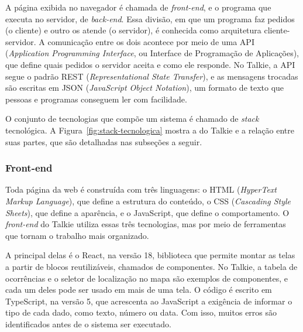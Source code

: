 \documentclass[12pt,a4paper]{article}
\begin{document}
A página exibida no navegador é chamada de \textit{front-end}, e o programa que executa no servidor, de \textit{back-end}. Essa divisão, em que um programa faz pedidos (o cliente) e outro os atende (o servidor), é conhecida como arquitetura cliente-servidor. A comunicação entre os dois acontece por meio de uma API (\textit{Application Programming Interface}, ou Interface de Programação de Aplicações), que define quais pedidos o servidor aceita e como ele responde. No Talkie, a API segue o padrão REST (\textit{Representational State Transfer}), e as mensagens trocadas são escritas em JSON (\textit{JavaScript Object Notation}), um formato de texto que pessoas e programas conseguem ler com facilidade.

O conjunto de tecnologias que compõe um sistema é chamado de \textit{stack} tecnológica. A Figura~\ref{fig:stack-tecnologica} mostra a do Talkie e a relação entre suas partes, que são detalhadas nas subseções a seguir.


\subsubsection{Front-end}
Toda página da web é construída com três linguagens: o HTML (\textit{HyperText Markup Language}), que define a estrutura do conteúdo, o CSS (\textit{Cascading Style Sheets}), que define a aparência, e o JavaScript, que define o comportamento. O \textit{front-end} do Talkie utiliza essas três tecnologias, mas por meio de ferramentas que tornam o trabalho mais organizado.

A principal delas é o React, na versão 18, biblioteca que permite montar as telas a partir de blocos reutilizáveis, chamados de componentes. No Talkie, a tabela de ocorrências e o seletor de localização no mapa são exemplos de componentes, e cada um deles pode ser usado em mais de uma tela. O código é escrito em TypeScript, na versão 5, que acrescenta ao JavaScript a exigência de informar o tipo de cada dado, como texto, número ou data. Com isso, muitos erros são identificados antes de o sistema ser executado.
\end{document}
